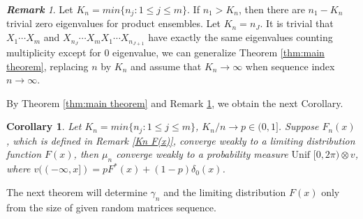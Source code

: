 \documentclass[12pt]{article}
\theoremstyle{plain}
\newtheorem{cor}{\textbf{Corollary}}
\theoremstyle{definition}
\theoremstyle{remark}
\newtheorem{rem}{\textbf{Remark}}
\begin{document}
\begin{rem}\label{rem: discard eigenvalue}
	Let $K_n=min\{ n_j : 1\leq j\leq m\}$. If $n_1>K_n $, then there are $n_1-K_n$ trivial zero eigenvalues for product ensembles. Let $K_n=n_J$. It is trivial that $X_{1} \cdots X_{m}$ and $X_{n_J} \cdots X_{m} X_{1} \cdots X_{n_{J+1}}$ have exactly the same eigenvalues counting multiplicity except for 0 eigenvalue, we can generalize Theorem \ref{thm:main theorem},  replacing $n$ by $K_n$ and assume that $K_n\rightarrow \infty$ when sequence index $n\rightarrow \infty$.
\end{rem}


By Theorem \ref{thm:main theorem} and Remark \ref{rem: discard eigenvalue}, we obtain the next Corollary.
\begin{cor}
	Let $K_n=min\{ n_j : 1\leq j\leq m\}$,  $K_n/n\rightarrow p\in (0,1]$. Suppose $F_n(x)$, which is defined in Remark \ref{Kn F(x)}, converge weakly to a limiting distribution function $F(x)$, then $\mu_{n}$ converge weakly to a probability measure $\text {Unif }[0,2 \pi) \otimes v$, where $v((-\infty,x])=pF^*(x)+(1-p)\delta_0(x)$.
\end{cor}

The next theorem will determine $\gamma_n$ and the limiting distribution $F(x)$ only from the size of given random matrices sequence.
\end{document}
